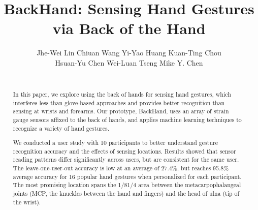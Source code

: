 \documentclass{sigchi}
\begin{document}
\newcommand{\getTitleName}{BackHand}

\title{\getTitleName: Sensing Hand Gestures via Back of the Hand}

\author{\alignauthor Jhe-Wei Lin\hspace{1cm} Chiuan Wang\hspace{1cm} Yi-Yao Huang\hspace{1cm} Kuan-Ting Chou\\Hsuan-Yu Chen\hspace{1cm} Wei-Luan Tseng\hspace{1cm} Mike Y. Chen\\
 \\ 
}


\maketitle

\begin{abstract}

In this paper, we explore using the back of hands for sensing hand gestures, which interferes less than glove-based approaches and provides better recognition than sensing at wrists and forearms. 
Our prototype, \getTitleName, uses an array of strain gauge sensors affixed to the back of hands, and applies machine learning techniques to recognize a variety of hand gestures.

We conducted a user study with 10 participants to better understand gesture recognition accuracy and the effects of sensing locations. Results showed that sensor reading patterns differ significantly across users, but are consistent for the same user. The leave-one-user-out accuracy is low at an average of 27.4\%, but reaches 95.8\% average accuracy for 16 popular hand gestures when personalized for each participant. The most promising location spans the 1/8\texttildelow{}1/4 area between the metacarpophalangeal joints (MCP, the knuckles between the hand and fingers) and the head of ulna (tip of the wrist).


\end{abstract}

\end{document}
